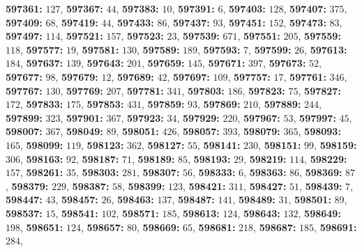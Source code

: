 \textsf{\bfseries 597361:} $127$, \textsf{\bfseries 597367:} $44$, \textsf{\bfseries 597383:} $10$, \textsf{\bfseries 597391:} $6$, \textsf{\bfseries 597403:} $128$, \textsf{\bfseries 597407:} $375$, \textsf{\bfseries 597409:} $68$, \textsf{\bfseries 597419:} $44$, \textsf{\bfseries 597433:} $86$, \textsf{\bfseries 597437:} $93$, \textsf{\bfseries 597451:} $152$, \textsf{\bfseries 597473:} $83$, \textsf{\bfseries 597497:} $114$, \textsf{\bfseries 597521:} $157$, \textsf{\bfseries 597523:} $23$, \textsf{\bfseries 597539:} $671$, \textsf{\bfseries 597551:} $205$, \textsf{\bfseries 597559:} $118$, \textsf{\bfseries 597577:} $19$, \textsf{\bfseries 597581:} $130$, \textsf{\bfseries 597589:} $189$, \textsf{\bfseries 597593:} $7$, \textsf{\bfseries 597599:} $26$, \textsf{\bfseries 597613:} $184$, \textsf{\bfseries 597637:} $139$, \textsf{\bfseries 597643:} $201$, \textsf{\bfseries 597659:} $145$, \textsf{\bfseries 597671:} $397$, \textsf{\bfseries 597673:} $52$, \textsf{\bfseries 597677:} $98$, \textsf{\bfseries 597679:} $12$, \textsf{\bfseries 597689:} $42$, \textsf{\bfseries 597697:} $109$, \textsf{\bfseries 597757:} $17$, \textsf{\bfseries 597761:} $346$, \textsf{\bfseries 597767:} $130$, \textsf{\bfseries 597769:} $207$, \textsf{\bfseries 597781:} $341$, \textsf{\bfseries 597803:} $186$, \textsf{\bfseries 597823:} $75$, \textsf{\bfseries 597827:} $172$, \textsf{\bfseries 597833:} $175$, \textsf{\bfseries 597853:} $431$, \textsf{\bfseries 597859:} $93$, \textsf{\bfseries 597869:} $210$, \textsf{\bfseries 597889:} $244$, \textsf{\bfseries 597899:} $323$, \textsf{\bfseries 597901:} $367$, \textsf{\bfseries 597923:} $34$, \textsf{\bfseries 597929:} $220$, \textsf{\bfseries 597967:} $53$, \textsf{\bfseries 597997:} $45$, \textsf{\bfseries 598007:} $367$, \textsf{\bfseries 598049:} $89$, \textsf{\bfseries 598051:} $426$, \textsf{\bfseries 598057:} $393$, \textsf{\bfseries 598079:} $365$, \textsf{\bfseries 598093:} $165$, \textsf{\bfseries 598099:} $119$, \textsf{\bfseries 598123:} $362$, \textsf{\bfseries 598127:} $55$, \textsf{\bfseries 598141:} $230$, \textsf{\bfseries 598151:} $99$, \textsf{\bfseries 598159:} $306$, \textsf{\bfseries 598163:} $92$, \textsf{\bfseries 598187:} $71$, \textsf{\bfseries 598189:} $85$, \textsf{\bfseries 598193:} $29$, \textsf{\bfseries 598219:} $114$, \textsf{\bfseries 598229:} $157$, \textsf{\bfseries 598261:} $35$, \textsf{\bfseries 598303:} $281$, \textsf{\bfseries 598307:} $56$, \textsf{\bfseries 598333:} $6$, \textsf{\bfseries 598363:} $86$, \textsf{\bfseries 598369:} $87$, \textsf{\bfseries 598379:} $229$, \textsf{\bfseries 598387:} $58$, \textsf{\bfseries 598399:} $123$, \textsf{\bfseries 598421:} $311$, \textsf{\bfseries 598427:} $51$, \textsf{\bfseries 598439:} $7$, \textsf{\bfseries 598447:} $43$, \textsf{\bfseries 598457:} $26$, \textsf{\bfseries 598463:} $137$, \textsf{\bfseries 598487:} $141$, \textsf{\bfseries 598489:} $31$, \textsf{\bfseries 598501:} $89$, \textsf{\bfseries 598537:} $15$, \textsf{\bfseries 598541:} $102$, \textsf{\bfseries 598571:} $185$, \textsf{\bfseries 598613:} $124$, \textsf{\bfseries 598643:} $132$, \textsf{\bfseries 598649:} $198$, \textsf{\bfseries 598651:} $124$, \textsf{\bfseries 598657:} $80$, \textsf{\bfseries 598669:} $65$, \textsf{\bfseries 598681:} $218$, \textsf{\bfseries 598687:} $185$, \textsf{\bfseries 598691:} $284$, 
